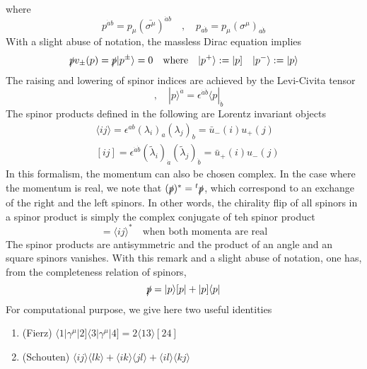 where 
\begin{equation*}
p^{\dot{a}b} = p_\mu(\bar{\sigma^\mu})^{\dot{a}b}
\quad,\quad
p_{a\dot{b}} = p_\mu(\sigma^\mu)_{a\dot{b}}
\end{equation*}
With a slight abuse of notation, the massless Dirac equation implies
\begin{equation*}
\slashed{p}v_\pm (p) = \slashed{p}|p^\pm\rangle = 0
\quad \mathrm{where}\quad
|p^+\rangle := |p]
\quad
|p^-\rangle := |p\rangle
\end{equation*}
The raising and lowering of spinor indices are achieved by the Levi-Civita tensor
\begin{equation*}
[p|^a = \epsilon^{ab}|p] \quad,\quad
|p\rangle^{\dot{a}} = \epsilon^{\dot{a}\dot{b}}\langle p |_{\dot{b}}
\end{equation*}
The spinor products defined in the following are Lorentz invariant objects
\begin{equation*}
\begin{split}
& \langle ij \rangle = \epsilon^{ab}(\lambda_i)_a(\lambda_j)_b = \bar{u}_-(i)u_+(j)
\\
& [ij] = \epsilon^{\dot{a}\dot{b}}(\tilde{\lambda}_i)_{\dot{a}}(\tilde{\lambda}_j)_{\dot{b}} = \bar{u}_+(i)u_-(j)
\end{split}
\end{equation*}
In this formalism, the momentum can also be chosen complex. 
In the case where the momentum is real, we note that
$(\slashed{p})^* = {}^t\slashed{p}$, which correspond to an exchange of the right and the left spinors. 
In other words, the chirality flip of all spinors in a spinor product is simply the complex conjugate of teh spinor product
\begin{equation*}
[ij] = \langle ij \rangle^* \quad\textrm{when both momenta are real}
\end{equation*}
The spinor products are antisymmetric and the product of an angle and an square spinors vanishes. 
With this remark and a slight abuse of notation, one has, from the completeness relation of spinors,
\begin{equation*}
\slashed{p} = |p\rangle [p| + |p]\langle p|
\end{equation*}
For computational purpose, we give here two useful identities
\begin{enumerate}
\item (Fierz) $\langle 1 |\gamma^\mu |2]\langle 3 |\gamma^\mu|4] = 2\langle 13 \rangle [24]$
\item (Schouten) $\langle ij \rangle \langle lk \rangle + \langle ik\rangle \langle jl\rangle + \langle il \rangle \langle kj \rangle$
\end{enumerate}

